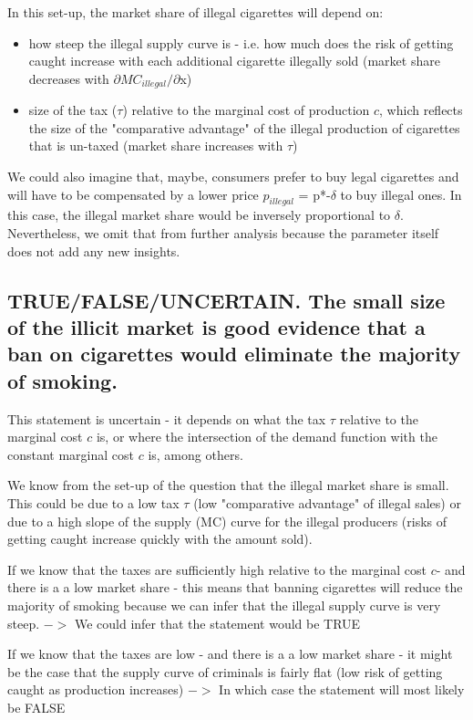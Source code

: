 \documentclass{article}
\begin{document}
In this set-up, the market share of illegal cigarettes will depend on:
\begin{itemize}
\item how steep the illegal supply curve is - i.e. how much does the
  risk of getting caught increase with each additional cigarette
  illegally sold (market share decreases with $\partial MC_{illegal}/\partial$x)
\item size of the tax ($\tau$) relative to the marginal cost of
  production $c$, which reflects the size of the "comparative
  advantage" of the illegal production of cigarettes that is un-taxed
  (market share increases with $\tau$)
\end{itemize}

We could also imagine that, maybe, consumers prefer to buy legal
cigarettes and will have to be compensated by a lower price
$p_{illegal}$ = p*-$\delta$ to buy illegal ones. In this case, the illegal
market share would be inversely proportional to $\delta$. Nevertheless, we
omit that from further analysis because the parameter itself does not
add any new insights. 

\subsection{TRUE/FALSE/UNCERTAIN. The small size of the illicit market
  is good evidence that a ban on cigarettes would eliminate the
  majority of smoking.}

This statement is uncertain - it depends on what the tax $\tau$ relative
to the marginal cost $c$ is, or where the intersection of the demand
function with the constant marginal cost $c$ is, among others.

We know from the set-up of the question that the illegal market share
is small. This could be due to a low tax $\tau$ (low "comparative
advantage" of illegal sales) or due to a high slope of the supply (MC)
curve for the illegal producers (risks of getting caught increase
quickly with the amount sold).

If we know that the taxes are sufficiently high relative to the
marginal cost $c$- and there is a a low market share - this means that
banning cigarettes will reduce the majority of smoking because we can
infer that the illegal supply curve is very steep. $->$ We could infer
that the statement would be TRUE

If we know that the taxes are low - and there is a a low market share
- it might be the case that the supply curve of criminals is fairly
flat (low risk of getting caught as production increases) $->$ In
which case the statement will most likely be FALSE
\end{document}
